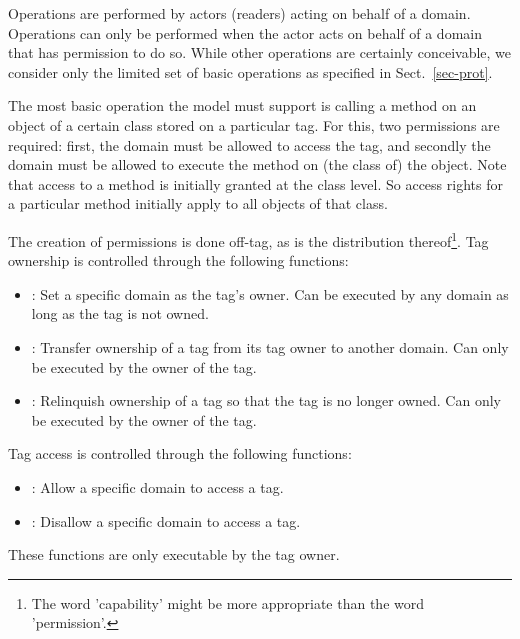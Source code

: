 Operations are performed by actors (readers) acting on behalf of a domain.
Operations can only be performed when the actor acts on behalf of a domain that
has permission to do so. While other operations are certainly conceivable, 
we consider only the limited set of basic operations as specified in Sect.~\ref{sec-prot}.

The most basic operation the model must support is calling a method on an
object of a certain class stored on a particular tag. For this, two permissions are
required: first, the domain must be allowed to access the tag, and secondly the domain 
must be allowed to execute the method on (the class of) the object. Note that access to a
method is initially granted at the class level. So access rights for a
particular method initially apply to all objects of that class.

The creation of permissions is done off-tag, as is the distribution 
thereof\footnote{The word 'capability' might be more appropriate than the word
	'permission'.
}.
Tag ownership is controlled through the following functions:
\begin{itemize}
\fixlistspacing
\item {}: Set a specific domain as the tag's owner. Can be
  executed by any domain as long as the tag is not owned.
\item {}: Transfer ownership of a tag from its tag
  owner to another domain. Can only be executed by the owner of the tag.
\item {}: Relinquish ownership of a tag so that the
  tag is no longer owned. Can only be executed by the owner of the tag.
\end{itemize}
Tag access is controlled through the following functions:
\begin{itemize} 
\fixlistspacing
\item {}: Allow a specific domain to access a tag. 
\item {}: Disallow a specific domain to access a tag.
\end{itemize}
These functions are only executable by the tag owner.



